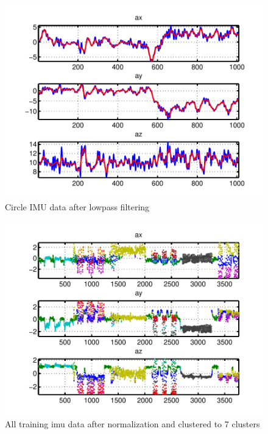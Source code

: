 \documentclass[twoside]{article}
\begin{document}
\begin{multicols}{2}
\begin{figure}[H]
\centering
\includegraphics[width=\columnwidth]{fig/filter.pdf} 
\caption{Circle IMU data after lowpass filtering}
\label{fig:imu_filt}
\end{figure}

\begin{figure}[H]
\centering
\includegraphics[width=\columnwidth]{fig/cluster.pdf} 
\caption{All training imu data after normalization and clustered to 7 clusters}
\label{fig:imu_cluster}
\end{figure}



\end{multicols}
\end{document}
